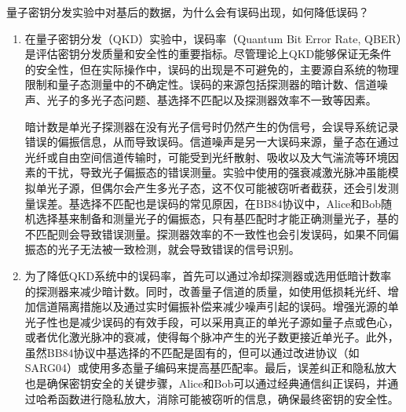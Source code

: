 \begin{question}
	量子密钥分发实验中对基后的数据，为什么会有误码出现，如何降低误码？
\end{question}
\begin{enumerate}
	\item 在量子密钥分发（QKD）实验中，误码率（Quantum Bit Error Rate, QBER）是评估密钥分发质量和安全性的重要指标。尽管理论上QKD能够保证无条件的安全性，但在实际操作中，误码的出现是不可避免的，主要源自系统的物理限制和量子态测量中的不确定性。误码的来源包括探测器的暗计数、信道噪声、光子的多光子态问题、基选择不匹配以及探测器效率不一致等因素。
	
	暗计数是单光子探测器在没有光子信号时仍然产生的伪信号，会误导系统记录错误的偏振信息，从而导致误码。信道噪声是另一大误码来源，量子态在通过光纤或自由空间信道传输时，可能受到光纤散射、吸收以及大气湍流等环境因素的干扰，导致光子偏振态的错误测量。实验中使用的强衰减激光脉冲虽能模拟单光子源，但偶尔会产生多光子态，这不仅可能被窃听者截获，还会引发测量误差。基选择不匹配也是误码的常见原因，在BB84协议中，Alice和Bob随机选择基来制备和测量光子的偏振态，只有基匹配时才能正确测量光子，基的不匹配则会导致错误测量。探测器效率的不一致性也会引发误码，如果不同偏振态的光子无法被一致检测，就会导致错误的信号识别。
	
	\item 为了降低QKD系统中的误码率，首先可以通过冷却探测器或选用低暗计数率的探测器来减少暗计数。同时，改善量子信道的质量，如使用低损耗光纤、增加信道隔离措施以及通过实时偏振补偿来减少噪声引起的误码。增强光源的单光子性也是减少误码的有效手段，可以采用真正的单光子源如量子点或色心，或者优化激光脉冲的衰减，使得每个脉冲产生的光子数更接近单光子。此外，虽然BB84协议中基选择的不匹配是固有的，但可以通过改进协议（如SARG04）或使用多态量子编码来提高基匹配率。最后，误差纠正和隐私放大也是确保密钥安全的关键步骤，Alice和Bob可以通过经典通信纠正误码，并通过哈希函数进行隐私放大，消除可能被窃听的信息，确保最终密钥的安全性。
\end{enumerate}